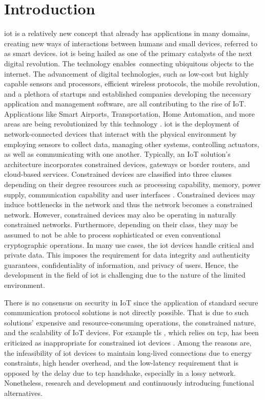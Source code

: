 \chapter{Introduction}
\label{ch:introduction}
\setcounter{page}{1}
\gls{iot} is a relatively new concept that already has applications in many domains, creating new ways of interactions between humans and small devices, referred to as smart devices. \gls{iot} is being hailed as one of the primary catalysts of the next digital revolution. The technology enables connecting ubiquitous objects to the internet. The advancement of digital technologies, such as low-cost but highly capable sensors and processors, efficient wireless protocols, the mobile revolution, and a plethora of startups and established companies developing the necessary application and management software, are all contributing to the rise of IoT.
Applications like Smart Airports, Transportation, Home Automation, and more areas are being revolutionized by this technology \cite{marksteiner2017overview}.
\gls{iot} is the deployment of network-connected devices that interact with the physical environment by employing sensors to collect data, managing other systems, controlling actuators, as well as communicating with one another. Typically, an IoT solution's architecture incorporates constrained devices, gateways or border routers, and cloud-based services. Constrained devices are classified into three classes depending on their degree resources such as processing capability, memory, power supply, communication capability and user interfaces \cite{rfc7228}. Constrained devices may induce bottlenecks in the network and thus the network becomes a constrained network. However, constrained devices may also be operating in naturally constrained networks. Furthermore, depending on their class, they may be assumed to not be able to process sophisticated or even conventional cryptographic operations. In many use cases, the \gls{iot} devices handle critical and private data. This imposes the requirement for data integrity and authenticity guarantees, confidentiality of information, and privacy of users. Hence, the development in the field of \gls{iot} is challenging due to the nature of the limited environment.
\par
There is no consensus on security in IoT since the application of standard secure communication protocol solutions is not directly possible. That is due to such solutions' expensive and resource-consuming operations, the constrained nature, and the scalability of IoT devices. For example \gls{tls} \cite{rfc5246}, which relies on \gls{tcp}, has been criticized as inappropriate for constrained \gls{iot} devices \cite{shang2016challenges}. Among the reasons are, the infeasibility of \gls{iot} devices to maintain long-lived connections due to energy constraints, high header overhead, and the low-latency requirement that is opposed by the delay due to \gls{tcp} handshake, especially in a lossy network. Nonetheless, research and development and continuously introducing functional alternatives. 
